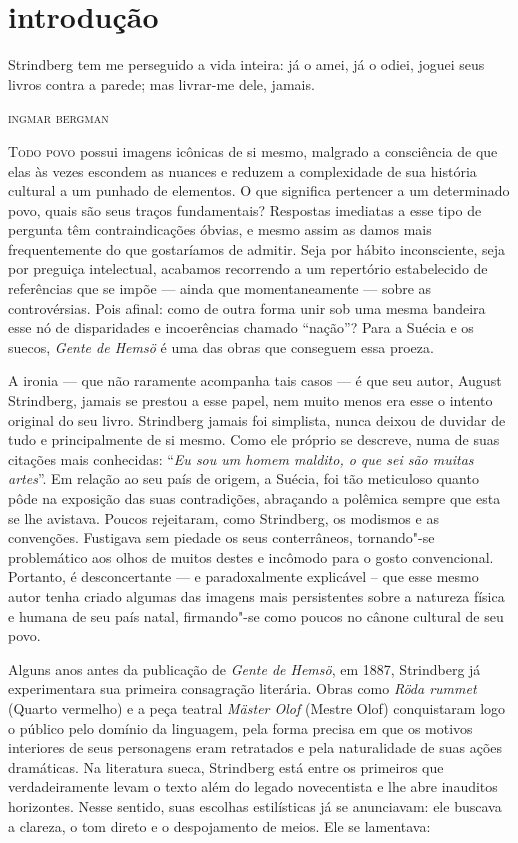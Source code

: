 \chapter[Introdução, por Leon Rabelo]{introdução}

\epigraph{Strindberg tem me perseguido a vida inteira: já o amei, já o odiei, 
joguei seus livros contra a parede; mas livrar-me dele, jamais.}{\textsc{ingmar bergman}}


\noindent\textsc{Todo povo} possui imagens icônicas de si mesmo, 
malgrado a consciência de que elas às vezes escondem as nuances e 
reduzem a complexidade de sua história cultural a um punhado de elementos. 
O que significa pertencer a um determinado povo, quais são seus traços fundamentais? 
Respostas imediatas a esse tipo de pergunta têm contraindicações óbvias, e
mesmo assim as damos mais frequentemente do que gostaríamos de admitir.
Seja por hábito inconsciente, seja por preguiça intelectual, acabamos
recorrendo a um repertório estabelecido de referências que se impõe --- ainda que
momentaneamente --- sobre as controvérsias.  Pois afinal: como de outra
forma unir sob uma mesma bandeira esse nó de disparidades e
incoerências chamado “nação”?  Para a Suécia e os suecos, 
\textit{Gente de Hemsö} é uma das obras que conseguem essa proeza. 

A ironia --- que não raramente acompanha tais casos --- é que seu autor,
August Strindberg, jamais se prestou a esse papel, nem muito menos era
esse o intento original do seu livro. Strindberg jamais foi simplista,
nunca deixou de duvidar de tudo e principalmente de si mesmo. Como ele
próprio se descreve, numa de suas citações mais conhecidas: ``\textit{Eu
sou um homem maldito, o que sei são muitas artes}''. Em relação ao seu
país de origem, a Suécia, foi tão meticuloso quanto pôde na exposição
das suas contradições, abraçando a polêmica sempre que esta se lhe
avistava. Poucos rejeitaram, como Strindberg, os modismos e as
convenções. Fustigava sem piedade os seus conterrâneos, tornando"-se
problemático aos olhos de muitos destes e incômodo para o gosto
convencional. Portanto, é desconcertante --- e paradoxalmente explicável
– que esse mesmo autor tenha criado algumas das imagens mais
persistentes sobre a natureza física e humana de seu país natal, 
firmando"-se como poucos no cânone cultural de seu povo. 

Alguns anos antes da publicação de \textit{Gente de Hemsö}, em 1887, Strindberg já experimentara
sua primeira consagração literária. Obras como
\textit{Röda rummet} (Quarto vermelho) e a peça teatral \textit{Mäster Olof} (Mestre Olof) 
conquistaram logo o público pelo domínio da linguagem, pela forma
precisa em que os motivos interiores de seus personagens eram
retratados e pela naturalidade de suas ações dramáticas. Na
literatura sueca, Strindberg está entre os primeiros que
verdadeiramente levam o texto além do legado novecentista
e lhe abre inauditos horizontes. Nesse sentido, suas
escolhas estilísticas já se anunciavam: ele buscava a clareza, o tom
direto e o despojamento de meios. Ele se lamentava: 

